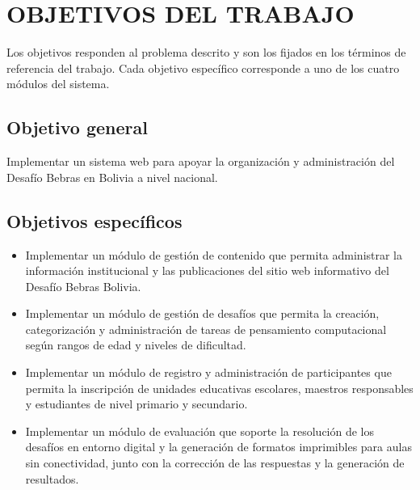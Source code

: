 \clearpage

\section{OBJETIVOS DEL TRABAJO}

Los objetivos responden al problema descrito y son los fijados en los términos de referencia del trabajo. Cada objetivo específico corresponde a uno de los cuatro módulos del sistema.

\vspace{0.5em}
\subsection{Objetivo general}

\vspace{0.3em}
Implementar un sistema web para apoyar la organización y administración del Desafío Bebras en Bolivia a nivel nacional.

\vspace{0.5em}
\subsection{Objetivos específicos}

\begin{itemize}
    \item Implementar un módulo de gestión de contenido que permita administrar la información institucional y las publicaciones del sitio web informativo del Desafío Bebras Bolivia.

    \item Implementar un módulo de gestión de desafíos que permita la creación, categorización y administración de tareas de pensamiento computacional según rangos de edad y niveles de dificultad.

    \item Implementar un módulo de registro y administración de participantes que permita la inscripción de unidades educativas escolares, maestros responsables y estudiantes de nivel primario y secundario.

    \item Implementar un módulo de evaluación que soporte la resolución de los desafíos en entorno digital y la generación de formatos imprimibles para aulas sin conectividad, junto con la corrección de las respuestas y la generación de resultados.
\end{itemize}
